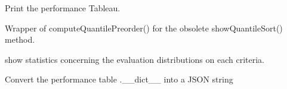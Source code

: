 \documentclass[letterpaper,10pt,english]{sphinxmanual}
\begin{document}
\begin{fulllineitems}
\begin{fulllineitems}
\end{fulllineitems}


\begin{fulllineitems}
\label{techDoc:perfTabs.PerformanceTableau.showPerformanceTableau}
Print the performance Tableau.

\end{fulllineitems}


\begin{fulllineitems}
\label{techDoc:perfTabs.PerformanceTableau.showQuantileSort}
Wrapper of computeQuantilePreorder() for the obsolete showQuantileSort() method.

\end{fulllineitems}


\begin{fulllineitems}
\label{techDoc:perfTabs.PerformanceTableau.showStatistics}
show statistics concerning the evaluation distributions
on each criteria.

\end{fulllineitems}


\begin{fulllineitems}
\label{techDoc:perfTabs.PerformanceTableau.to_JSON}
Convert the performance table .\_\_dict\_\_ into a JSON string

\end{fulllineitems}


\end{fulllineitems}

\end{document}

